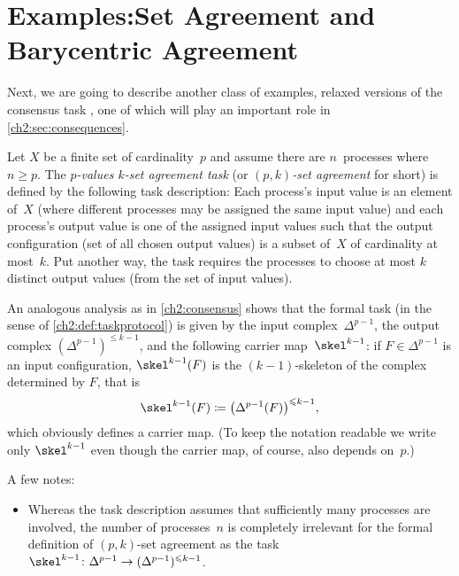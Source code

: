 \vfill %


\section[Examples: Set Agreement and Barycentric Agreement]{%
         Examples:\newline Set Agreement and Barycentric Agreement}
Next, we are going to describe another class of examples, relaxed versions of
the consensus task , one of which will play an important
role in \cref{ch2:sec:consequences}.

\begin{thExample}
    \label{ch2:setagreement}
    Let $X$ be a finite set of cardinality~$p$ and assume there are
    $n$~processes where $n\geq p$.  The \emph{$p$-values $k$-set
    agreement task} (or \emph{$(p,k)$-set agreement} for short) is
    defined by the following task description:
    Each process's input value is an element of~$X$ (where different
    processes may be assigned the same input value) and each process's
    output value is one of the assigned input values such that
    the output configuration (set of all chosen output values)
    is a subset of~$X$ of cardinality at most~$k$. Put another way,
    the task requires the processes to choose at most $k$ distinct
    output values (from the set of input values).
    
    An analogous analysis as in \cref{ch2:consensus} shows that
    the formal task (in the sense of \cref{ch2:def:taskprotocol})
    is given by the input complex~$\Delta^{p-1}$, the output complex
    $(\Delta^{p-1})^{\leq k-1}$, and the following carrier map~$\skel^{k-1}$:
    if $F\in\Delta^{p-1}$ is an input configuration, $\skel^{k-1}(F)$ is the
    $(k{-}1)$-skeleton of the complex determined by $F$, that is
    \[ \skel^{k-1}(F) \defeq \bigl(\Delta^{p-1}(F)\bigr)^{\leq k-1}
    , \]
    which obviously defines a carrier map. (To keep the notation
    readable we write only $\skel^{k-1}$ even though the carrier map,
    of course, also depends on~$p$.)
    
    A few notes:
    \begin{itemize}
        \item
            Whereas the task description assumes that sufficiently many
            processes are involved, the number of processes~$n$ is completely
            irrelevant for the formal definition of $(p,k)$-set agreement
            as the task
            $\skel^{k-1}\colon\Delta^{p-1}\to(\Delta^{p-1})^{\leq k-1}$.
            

\end{itemize}
\end{thExample}
